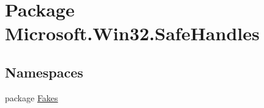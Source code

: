 \hypertarget{namespace_microsoft_1_1_win32_1_1_safe_handles}{\section{Package Microsoft.\-Win32.\-Safe\-Handles}
\label{namespace_microsoft_1_1_win32_1_1_safe_handles}
}
\subsection*{Namespaces}
\begin{DoxyCompactItemize}
\item 
package \hyperlink{namespace_microsoft_1_1_win32_1_1_safe_handles_1_1_fakes}{Fakes}
\end{DoxyCompactItemize}
